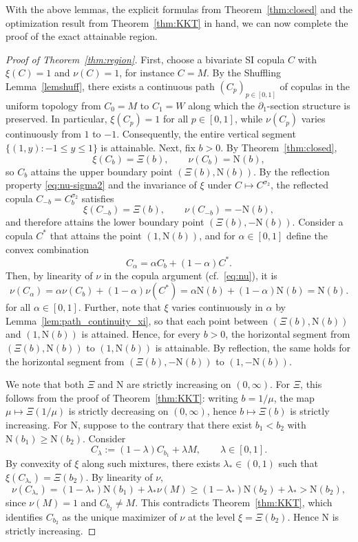 \documentclass{article}
\newcommand{\1}{\mathds{1}}
\newcommand{\NN}{\mathrm{N}}
\begin{document}
With the above lemmas, the explicit formulas from Theorem~\ref{thm:closed} and the optimization result from Theorem~\ref{thm:KKT} in hand, we can now complete the proof of the exact attainable region.

\begin{proof}[Proof of Theorem~\ref{thm:region}]
First, choose a bivariate SI copula \(C\) with \(\xi(C)=1\) and \(\nu(C)=1\), for instance \(C=M\).
By the Shuffling Lemma~\ref{lemshuff}, there exists a continuous path \((C_p)_{p\in[0,1]}\) of copulas in the uniform topology from \(C_0=M\) to \(C_1=W\) along which the \(\partial_1\)-section structure is preserved.
In particular, \(\xi(C_p)=1\) for all \(p\in[0,1]\), while \(\nu(C_p)\) varies continuously from \(1\) to \(-1\).
Consequently, the entire vertical segment $\{(1,y): -1\le y\le 1\}$ is attainable.
Next, fix \(b>0\). By Theorem~\ref{thm:closed},
\[
\xi(C_b)=\Xi(b),\qquad \nu(C_b)=\NN(b),
\]
so \(C_b\) attains the upper boundary point \((\Xi(b),\NN(b))\).
By the reflection property \eqref{eq:nu-sigma2} and the invariance of \(\xi\) under \(C\mapsto C^{\sigma_2}\), the reflected copula \(C_{-b}=C_b^{\sigma_2}\) satisfies
\[
\xi(C_{-b})=\Xi(b),\qquad \nu(C_{-b})=-\NN(b),
\]
and therefore attains the lower boundary point \((\Xi(b),-\NN(b))\).
Consider a copula $C^\ast$ that attains the point $(1,\NN(b))$, and for $\alpha\in[0,1]$ define the convex combination
\[
C_\alpha = \alpha C_b + (1-\alpha) C^\ast.
\]
Then, by linearity of \(\nu\) in the copula argument (cf.~\eqref{eq:nu}), it is
\[
\nu(C_\alpha) = \alpha \nu(C_b) + (1-\alpha)\nu(C^\ast) = \alpha \NN(b) + (1-\alpha)\NN(b) = \NN(b).
\]
for all \(\alpha\in[0,1].\)
Further, note that \(\xi\) varies continuously in $\alpha$ by Lemma~\ref{lem:path_continuity_xi}, so that each point between \((\Xi(b),\NN(b))\) and \((1,\NN(b))\) is attained.
Hence, for every \(b>0\), the horizontal segment from \((\Xi(b),\NN(b))\) to \((1,\NN(b))\) is attainable.
By reflection, the same holds for the horizontal segment from \((\Xi(b),-\NN(b))\) to \((1,-\NN(b))\).

We note that both \(\Xi\) and \(\NN\) are strictly increasing on \((0,\infty)\).
For \(\Xi\), this follows from the proof of Theorem~\ref{thm:KKT}: writing \(b=1/\mu\), the map
\(
\mu\mapsto \Xi(1/\mu)
\)
is strictly decreasing on \((0,\infty)\), hence \(b\mapsto \Xi(b)\) is strictly increasing.
For \(\NN\), suppose to the contrary that there exist \(b_1<b_2\) with \(\NN(b_1)\ge \NN(b_2)\).
Consider
\[
C_\lambda:=(1-\lambda)C_{b_1}+\lambda M,
\qquad \lambda\in[0,1].
\]
By convexity of \(\xi\) along such mixtures, there exists \(\lambda_*\in(0,1)\) such that
\(
\xi(C_{\lambda_*})=\Xi(b_2).
\)
By linearity of \(\nu\),
\[
\nu(C_{\lambda_*})
=(1-\lambda_*)\NN(b_1)+\lambda_*\nu(M)
\ge (1-\lambda_*)\NN(b_2)+\lambda_*
> \NN(b_2),
\]
since \(\nu(M)=1\) and \(C_{b_2}\neq M\).
This contradicts Theorem~\ref{thm:KKT}, which identifies \(C_{b_2}\) as the unique maximizer of \(\nu\) at the level \(\xi=\Xi(b_2)\).
Hence \(\NN\) is strictly increasing.


\end{proof}
\end{document}

